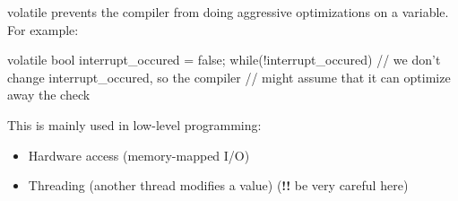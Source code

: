 \documentclass[10pt,graphics,aspectratio=169,table]{beamer}
\begin{document}
    \begin{frame}[fragile]{volatile}
  prevents the compiler from doing aggressive
                optimizations on a variable. For example:

        \begin{codeblock}
volatile bool interrupt_occured = false;
while(!interrupt_occured){
    // we don't change interrupt_occured, so the compiler
    // might assume that it can optimize away the check
}
        \end{codeblock}

        This is mainly used in low-level programming:
        \begin{itemize}
            \item Hardware access (memory-mapped I/O)
            \item Threading (another thread modifies a value) (\textbf{!!} be very careful here)
        \end{itemize}
    \end{frame}
\end{document}
